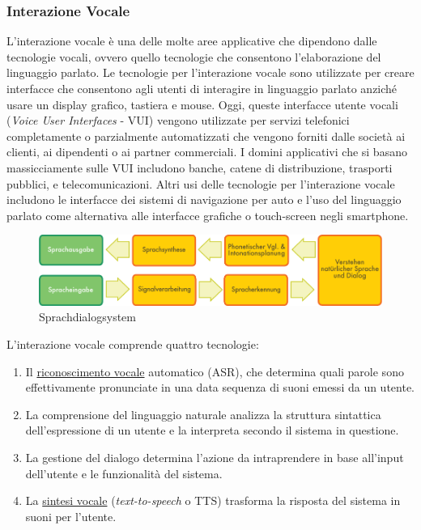 \documentclass[]{../../metanetpaper}
\begin{document}
\begin{multicols}{2}
\subsubsection{Interazione Vocale}

L'interazione vocale \`{e} una delle molte aree applicative che dipendono
dalle tecnologie vocali, ovvero quello tecnologie che consentono
l'elaborazione del linguaggio parlato. Le tecnologie per l'interazione vocale
sono utilizzate per creare interfacce che consentono agli utenti di interagire
in linguaggio parlato anzich\'{e} usare un display grafico, tastiera e
mouse. Oggi, queste interfacce utente vocali (\emph{Voice User Interfaces} -
VUI) vengono utilizzate per servizi telefonici completamente o parzialmente
automatizzati che vengono forniti dalle societ\`{a} ai clienti, ai dipendenti
o ai partner commerciali. I domini applicativi che si basano massicciamente
sulle VUI includono banche, catene di distribuzione, trasporti pubblici, e
telecomunicazioni. Altri usi delle tecnologie per l'interazione vocale
includono le interfacce dei sistemi di navigazione per auto e l'uso del
linguaggio parlato come alternativa alle interfacce grafiche o touch-screen
negli smartphone.



\begin{figure}[htb]
  \center 
  \includegraphics[width=\textwidth]{../_media/german/simple_speech-based_dialogue_architecture}
  \caption{Sprachdialogsystem}
  \label{fig:dialoguearch_de}
\end{figure}

L'interazione vocale comprende quattro tecnologie: 


\begin{enumerate}
\item Il \underline{riconoscimento vocale} automatico (ASR), che determina quali parole sono effettivamente pronunciate in una data sequenza di suoni emessi da un utente.
\item La comprensione del linguaggio naturale analizza la struttura sintattica dell'espressione di un utente e la interpreta secondo il sistema in questione.
\item La gestione del dialogo determina l'azione da intraprendere in base all'input dell'utente e le funzionalit\`{a} del sistema.
\item La \underline{sintesi vocale} (\emph{text-to-speech} o TTS) trasforma la risposta del sistema in suoni per l'utente.
\end{enumerate}


\end{multicols}
\end{document}
